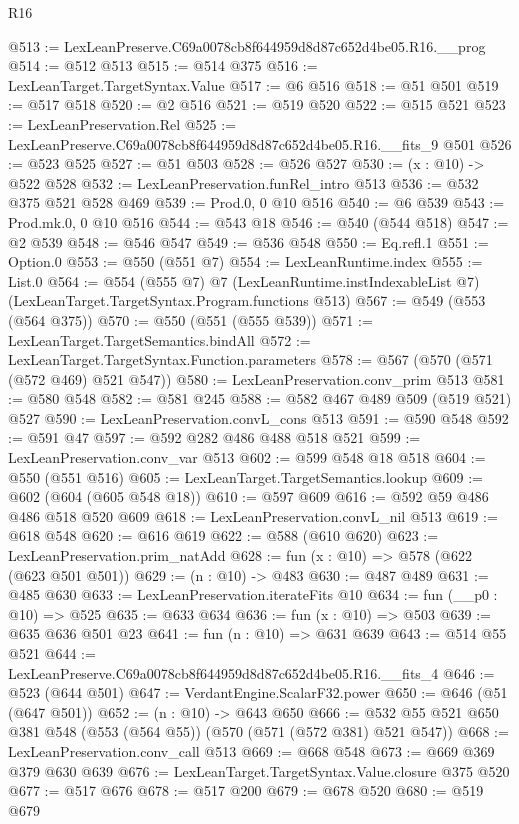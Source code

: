 \begin{lexlean}{R16}
\begin{coremodule}
@513 := LexLeanPreserve.C69a0078cb8f644959d8d87c652d4be05.R16.__prog
@514 := @512 @513
@515 := @514 @375
@516 := LexLeanTarget.TargetSyntax.Value
@517 := @6 @516
@518 := @51 @501
@519 := @517 @518
@520 := @2 @516
@521 := @519 @520
@522 := @515 @521
@523 := LexLeanPreservation.Rel
@525 := LexLeanPreserve.C69a0078cb8f644959d8d87c652d4be05.R16.__fits_9 @501
@526 := @523 @525
@527 := @51 @503
@528 := @526 @527
@530 := (x : @10) -> @522 @528
@532 := LexLeanPreservation.funRel_intro @513
@536 := @532 @375 @521 @528 @469
@539 := Prod.{0, 0} @10 @516
@540 := @6 @539
@543 := Prod.mk.{0, 0} @10 @516
@544 := @543 @18
@546 := @540 (@544 @518)
@547 := @2 @539
@548 := @546 @547
@549 := @536 @548
@550 := Eq.refl.{1}
@551 := Option.{0}
@553 := @550 (@551 @7)
@554 := LexLeanRuntime.index
@555 := List.{0}
@564 := @554
    (@555 @7)
    @7
    (LexLeanRuntime.instIndexableList @7)
    (LexLeanTarget.TargetSyntax.Program.functions @513)
@567 := @549 (@553 (@564 @375))
@570 := @550 (@551 (@555 @539))
@571 := LexLeanTarget.TargetSemantics.bindAll
@572 := LexLeanTarget.TargetSyntax.Function.parameters
@578 := @567 (@570 (@571 (@572 @469) @521 @547))
@580 := LexLeanPreservation.conv_prim @513
@581 := @580 @548
@582 := @581 @245
@588 := @582 @467 @489 @509 (@519 @521) @527
@590 := LexLeanPreservation.convL_cons @513
@591 := @590 @548
@592 := @591 @47
@597 := @592 @282 @486 @488 @518 @521
@599 := LexLeanPreservation.conv_var @513
@602 := @599 @548 @18 @518
@604 := @550 (@551 @516)
@605 := LexLeanTarget.TargetSemantics.lookup
@609 := @602 (@604 (@605 @548 @18))
@610 := @597 @609
@616 := @592 @59 @486 @486 @518 @520 @609
@618 := LexLeanPreservation.convL_nil @513
@619 := @618 @548
@620 := @616 @619
@622 := @588 (@610 @620)
@623 := LexLeanPreservation.prim_natAdd
@628 := fun (x : @10) => @578 (@622 (@623 @501 @501))
@629 := (n : @10) -> @483
@630 := @487 @489
@631 := @485 @630
@633 := LexLeanPreservation.iterateFits @10
@634 := fun (__p0 : @10) => @525
@635 := @633 @634
@636 := fun (x : @10) => @503
@639 := @635 @636 @501 @23
@641 := fun (n : @10) => @631 @639
@643 := @514 @55 @521
@644 := LexLeanPreserve.C69a0078cb8f644959d8d87c652d4be05.R16.__fits_4
@646 := @523 (@644 @501)
@647 := VerdantEngine.ScalarF32.power
@650 := @646 (@51 (@647 @501))
@652 := (n : @10) -> @643 @650
@666 := @532 @55 @521 @650 @381 @548 (@553 (@564 @55)) (@570 (@571 (@572 @381) @521 @547))
@668 := LexLeanPreservation.conv_call @513
@669 := @668 @548
@673 := @669 @369 @379 @630 @639
@676 := LexLeanTarget.TargetSyntax.Value.closure @375 @520
@677 := @517 @676
@678 := @517 @200
@679 := @678 @520
@680 := @519 @679

\end{coremodule}
\end{lexlean}
